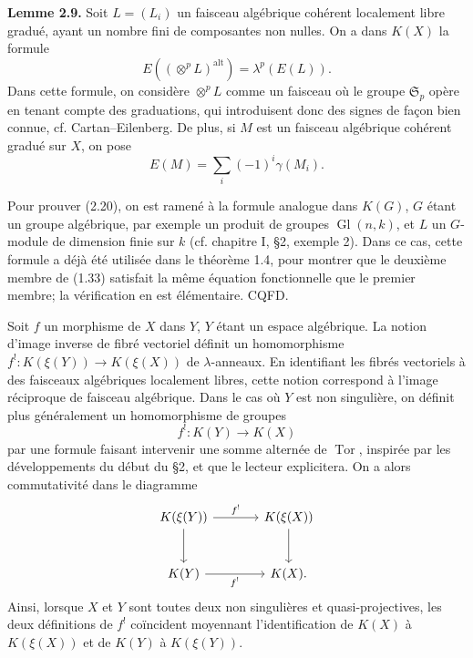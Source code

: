 \documentclass[11pt]{article}
\newcommand{\Tor}{\operatorname{Tor}}
\providecommand{\Tor}{\operatorname{Tor}}
\begin{document}
\textbf{Lemme 2.9.} Soit $L=(L_i)$ un faisceau algébrique cohérent localement libre gradué, ayant un nombre fini de composantes non nulles. On a dans $K(X)$ la formule
\begin{equation}\tag{2.20}
 E\left((\otimes^pL)^{\mathrm{alt}}\right)=\lambda^p(E(L)).
\end{equation}
Dans cette formule, on considère $\otimes^pL$ comme un faisceau où le groupe $\mathfrak S_p$ opère en tenant compte des graduations, qui introduisent donc des signes de façon bien connue, cf. Cartan--Eilenberg. De plus, si $M$ est un faisceau algébrique cohérent gradué sur $X$, on pose
\[
 E(M)=\sum_i(-1)^i\gamma(M_i).
\]

Pour prouver (2.20), on est ramené à la formule analogue dans $K(G)$, $G$ étant un groupe algébrique, par exemple un produit de groupes $\operatorname{Gl}(n,k)$, et $L$ un $G$-module de dimension finie sur $k$ (cf. chapitre I, \S 2, exemple 2). Dans ce cas, cette formule a déjà été utilisée dans le théorème 1.4, pour montrer que le deuxième membre de (1.33) satisfait la même équation fonctionnelle que le premier membre; la vérification en est élémentaire. CQFD.

Soit $f$ un morphisme de $X$ dans $Y$, $Y$ étant un espace algébrique. La notion d'image inverse de fibré vectoriel définit un homomorphisme $f^!:K(\xi(Y))\to K(\xi(X))$ de $\lambda$-anneaux. En identifiant les fibrés vectoriels à des faisceaux algébriques localement libres, cette notion correspond à l'image réciproque de faisceau algébrique. Dans le cas où $Y$ est non singulière, on définit plus généralement un homomorphisme de groupes
\begin{equation}\tag{2.21}
 f^!:K(Y)\longrightarrow K(X)
\end{equation}
par une formule faisant intervenir une somme alternée de $\Tor$, inspirée par les développements du début du \S 2, et que le lecteur explicitera. On a alors commutativité dans le diagramme
\[
\begin{tikzcd}[column sep=large,row sep=large]
K(\xi(Y)) \arrow[r,"f^!"] \arrow[d] & K(\xi(X)) \arrow[d]\\
K(Y) \arrow[r,"f^!"'] & K(X).
\end{tikzcd}
\]
Ainsi, lorsque $X$ et $Y$ sont toutes deux non singulières et quasi-projectives, les deux définitions de $f^!$ coïncident moyennant l'identification de $K(X)$ à $K(\xi(X))$ et de $K(Y)$ à $K(\xi(Y))$.
\end{document}
